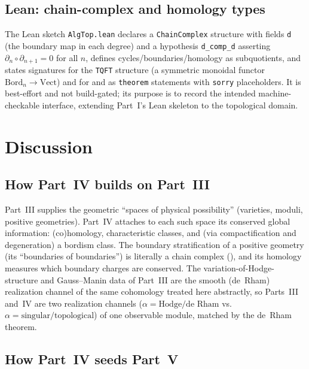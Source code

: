 \documentclass[12pt]{article}
\theoremstyle{definition}
\theoremstyle{remark}
\newcommand{\Bord}{\mathrm{Bord}}
\newcommand{\Vect}{\mathrm{Vect}}
\begin{document}
\subsection{Lean: chain-complex and homology types}

The Lean sketch \texttt{AlgTop.lean} declares a \texttt{ChainComplex} structure
with fields \texttt{d} (the boundary map in each degree) and a hypothesis
\texttt{d\_comp\_d} asserting $\partial_n\circ\partial_{n+1}=0$ for all $n$,
defines cycles/boundaries/homology as subquotients, and states signatures for the
\texttt{TQFT} structure (a symmetric monoidal functor $\Bord_n\to\Vect$) and for
 and  as \texttt{theorem} statements with
\texttt{sorry} placeholders. It is best-effort and not build-gated; its purpose is
to record the intended machine-checkable interface, extending Part~I's Lean
skeleton to the topological domain.

\section{Discussion}
\label{sec:discussion}

\subsection{How Part~IV builds on Part~III}

Part~III supplies the geometric ``spaces of physical possibility'' (varieties,
moduli, positive geometries). Part~IV attaches to each such space its conserved
global information: (co)homology, characteristic classes, and (via
compactification and degeneration) a bordism class. The boundary stratification of a
positive geometry (its ``boundaries of boundaries'') is literally a chain complex
(), and its homology measures which boundary charges are conserved.
The variation-of-Hodge-structure and Gauss--Manin data of Part~III are the smooth
(de~Rham) realization channel of the same cohomology treated here abstractly, so
Parts~III and~IV are two realization channels ($\alpha=\text{Hodge/de~Rham}$ vs.\
$\alpha=\text{singular/topological}$) of one observable module, matched by the
de~Rham theorem.

\subsection{How Part~IV seeds Part~V}
\end{document}
